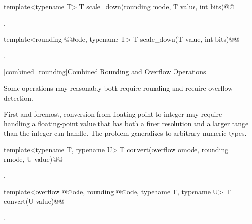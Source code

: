 \begin{addedblock}
\begin{itemdecl}
template<typename T> T scale_down(rounding mode, T value, int bits)@\addmodif{;}@
\end{itemdecl}

\begin{itemdescr}
\returns {}.	
\end{itemdescr}

\begin{itemdecl}
template<rounding @@ode, typename T> T scale_down(T value, int bits)@\addmodif{;}@
\end{itemdecl}

\begin{itemdescr}
\returns {}.	
\end{itemdescr}

[combined_rounding]{Combined Rounding and Overflow Operations}

Some operations may reasonably both require rounding and require overflow detection.

First and foremost, conversion from floating-point to integer may require handling a floating-point value that has both a finer resolution and a larger range than the integer can handle. The problem generalizes to arbitrary numeric types.

\begin{itemdecl}
template<typename T, typename U> T convert(overflow omode, rounding rmode, U value)@\addmodif{;}@
\end{itemdecl}

\begin{itemdescr}
\returns {}.	
\end{itemdescr}

\begin{itemdecl}
template<overflow @@ode, rounding @@ode, typename T, typename U> T convert(U value)@\addmodif{;}@
\end{itemdecl}

\begin{itemdescr}
\returns {}.
\end{itemdescr}


\end{addedblock}
